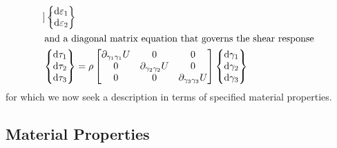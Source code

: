 \begin{subequations}
\begin{align}
\begin{bmatrix}
    \end{bmatrix}
    \left\{ \begin{matrix}
    \mathrm{d} \varepsilon_1 \\ \mathrm{d} \varepsilon_2 
    \end{matrix} \right\} \\
    \intertext{and a diagonal matrix equation that governs the shear response}
    \left\{ \begin{matrix} 
    \mathrm{d} \tau_1 \\ \mathrm{d} \tau_2 \\ \mathrm{d} \tau_3
    \end{matrix} \right\} & = \rho \begin{bmatrix}
    \partial_{\gamma_1\gamma_1} U & 0 & 0 \\
    0 & \partial_{\gamma_2\gamma_2} U & 0 \\
    0 & 0 & \partial_{\gamma_3\gamma_3} U
    \end{bmatrix}
    \left\{ \begin{matrix}
    \mathrm{d} \gamma_1 \\ \mathrm{d} \gamma_2 \\ \mathrm{d} \gamma_3
    \end{matrix} \right\}
    \end{align}
\end{subequations}
for which we now seek a description in terms of specified material properties.

\subsection{Material Properties}
\label{secMaterialConstants3D}

